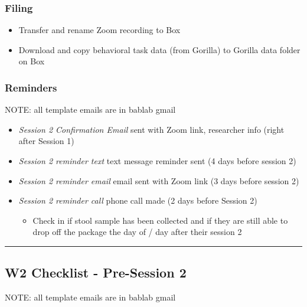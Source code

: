 \documentclass[
]{book}
\providecommand{\tightlist}{%
  \setlength{\itemsep}{0pt}\setlength{\parskip}{0pt}}
\begin{document}
\hypertarget{filing-5}{%
\subsubsection{Filing}\label{filing-5}}

\begin{itemize}
\tightlist
\item
  Transfer and rename Zoom recording to Box
\item
  Download and copy behavioral task data (from Gorilla) to Gorilla data folder on Box
\end{itemize}

\hypertarget{reminders-3}{%
\subsubsection{Reminders}\label{reminders-3}}

NOTE: all template emails are in bablab gmail

\begin{itemize}
\tightlist
\item
  \emph{Session 2 Confirmation Email} sent with Zoom link, researcher info (right after Session 1)
\item
  \emph{Session 2 reminder text} text message reminder sent (4 days before session 2)
\item
  \emph{Session 2 reminder email} email sent with Zoom link (3 days before session 2)
\item
  \emph{Session 2 reminder call} phone call made (2 days before Session 2)

  \begin{itemize}
  \tightlist
  \item
    Check in if stool sample has been collected and if they are still able to drop off the package the day of / day after their session 2
  \end{itemize}
\end{itemize}

\begin{center}\rule{0.5\linewidth}{0.5pt}\end{center}

\hypertarget{w2-checklist---pre-session-2}{%
\subsection{W2 Checklist - Pre-Session 2}\label{w2-checklist---pre-session-2}}

NOTE: all template emails are in bablab gmail
\end{document}
